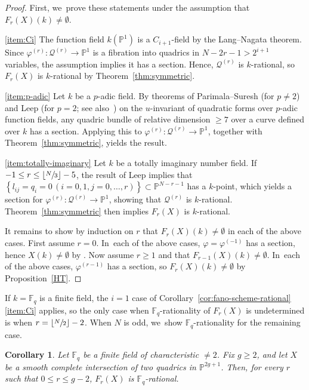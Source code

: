 \documentclass[JEP,XML,SOM,Unicode,NoEqCountersInSection,published]{cedram}
\let\bb\mathbb\let\Bbb\mathbb
\theoremstyle{plain}
\newtheorem{cor}[thm]{Corollary}
\theoremstyle{definition}
\let\phi\varphi
\renewcommand\P{\mathbb{P}}
\newcommand\F{\mathbb{F}}
\begin{document}
\begin{proof}
First, we~prove these statements under the assumption that \(F_r(X)(k)\neq\emptyset\).

\eqref{item:Ci} The function field $k(\P^1)$ is a $C_{i+1}$-field by the Lang--Nagata theorem.
Since $\phi^{(r)}\colon\mathcal{Q}^{(r)}\to \P^1$ is a fibration into quadrics in $N-2r-1>2^{i+1}$ variables, the assumption implies it has a section.
Hence, $\mathcal{Q}^{(r)}$ is $k$\nobreakdash-rational, so
$F_r(X)$ is $k$\nobreakdash-rational by Theorem~\ref{thm:symmetric}.

\eqref{item:p-adic} Let $k$ be a $p$-adic field.
By theorems of Parimala--Suresh \cite[Th.\,4.6]{parimalasuresh2010} (for $p\neq 2$) and Leep \cite[Th.\,3.4]{Leep2013} (for $p=2$; see also~\cite{ParimalaSuresh14})
on the $u$-invariant of quadratic forms over $p$-adic function fields,
any quadric bundle of relative dimension $\geq 7$
over a curve defined over $k$ has a section.
Applying this to $\phi^{(r)}\colon \mathcal{Q}^{(r)}\to \P^1$, together with
Theorem~\ref{thm:symmetric},
yields the result.

\eqref{item:totally-imaginary}
Let $k$ be a totally imaginary number field. If~$-1\leq r\leq \lfloor\sfrac{N}{3}\rfloor -5$, the result of Leep \cite[Th.\,2.7]{Leep84} implies that $\left\{l_{ij}=q_i =0\, (i=0,1, j=0,\dots,r)\right\}\subset \P^{N-r-1}$ has a $k$\nobreakdash-point,
which yields a section for $\phi^{(r)}\colon \mathcal{Q}^{(r)}\to \P^1$, showing that $\mathcal{Q}^{(r)}$ is $k$\nobreakdash-rational.
Theorem~\ref{thm:symmetric} then implies $F_r(X)$ is $k$\nobreakdash-rational.

It remains to show by induction on \(r\) that \(F_r(X)(k)\neq\emptyset\) in each of the above cases.
First assume $r=0$. In~each of the above cases, $\phi=\phi^{(-1)}$ has a section, hence $X(k)\neq \emptyset$ by \cite[Th.\,2.2]{Leep}.
Now assume \(r\geq 1\) and that \(F_{r-1}(X)(k)\neq\emptyset\). In~each of the above cases, \(\phi^{(r-1)}\) has a section, so \(F_r(X)(k)\neq\emptyset\) by Proposition~\ref{HT}.
\end{proof}

If $k=\F_q$ is a finite field,
the $i=1$ case of Corollary~\ref{cor:fano-scheme-rational}\eqref{item:Ci} applies,
so the only case when $\F_q$-rationality of $F_r(X)$ is undetermined is when $r=\lfloor\sfrac{N}{2}\rfloor-2$.
When $N$ is odd, we~show $\F_q$-rationality for the remaining case.

\begin{cor}\label{thm:fano-scheme-rational-finite}
Let $\bb F_q$ be a finite field of characteristic \(\neq 2\).
Fix $g\geq 2$, and let $X$ be a smooth complete intersection of two quadrics in $\P^{2g+1}$.
Then, for every $r$ such that $0\leq r\leq g-2$, $F_r(X)$ is $\bb F_q$-rational.
\end{cor}
\end{document}
